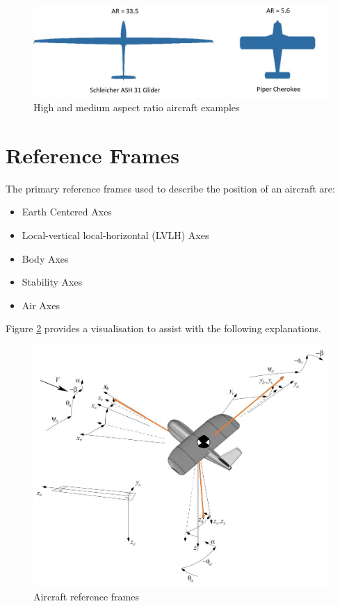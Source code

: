 \begin{figure}[H]
  \centering
  \includegraphics[width=1\linewidth]{03_LiteratureReview/Figs/AspectRatio.JPG}
  \caption{High and medium aspect ratio aircraft examples}
  \label{fig:AR}
\end{figure}

\section{Reference Frames}
The primary reference frames used to describe the position of an aircraft are:
\begin{itemize}
    \item Earth Centered Axes
    \item Local-vertical local-horizontal (LVLH) Axes
    \item Body Axes
    \item Stability Axes
    \item Air Axes
\end{itemize}

Figure \ref{fig:refernce} provides a visualisation to assist with the following explanations.

\begin{figure}[H]
  \centering
  \includegraphics[width=1\linewidth]{03_LiteratureReview/Figs/referenceFrame.JPG}
  \caption{Aircraft reference frames}
  \label{fig:refernce}
\end{figure}

